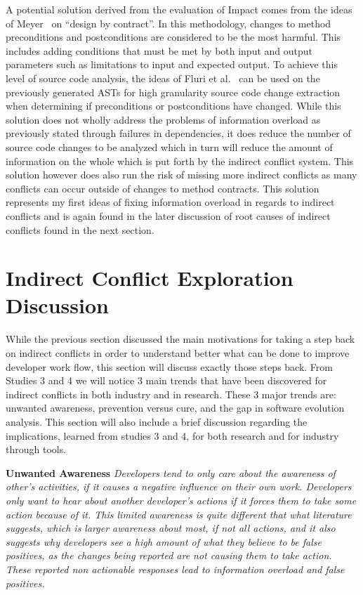 A potential solution derived from the evaluation of Impact comes from the ideas of Meyer~\cite{Meyer:1988} on 
``design by contract''. In this methodology, changes to method preconditions and postconditions are considered 
to be the most harmful. This includes adding conditions that must be met by both input and output parameters 
such as limitations to input and expected output. To achieve this level of source code analysis, the ideas of 
Fluri et al.~\cite{Fluri:2007:CDT} can be used on the previously generated ASTs for high granularity source code 
change extraction when determining if preconditions or postconditions have changed. While this solution does not 
wholly address the problems of information overload as previously stated through failures in dependencies, it does 
reduce the number of source code changes to  be analyzed which in turn will reduce the amount of information on 
the whole which is put forth by the indirect
conflict system. This solution however does also run the risk of missing more indirect conflicts as many conflicts
can occur outside of changes to method contracts. This solution represents my first ideas of fixing information overload in regards to
indirect conflicts and is again found in the later discussion of root causes of indirect conflicts found in
the next section.

\section{Indirect Conflict Exploration Discussion}

While the previous section discussed the main motivations for taking a step back on indirect conflicts in order to understand
better what can be done to improve developer work flow, this section will discuss exactly those steps back. From Studies 3 and
4 we will notice 3 main trends that have been discovered for indirect conflicts in both industry and in research. These 3 major
trends are: unwanted awareness, prevention versus cure, and the gap in software evolution analysis. This
section will also include a brief discussion regarding the implications, learned from studies 3 and 4, for both research and
for industry through tools.

\textbf{Unwanted Awareness} \textit{Developers tend to only care about the awareness of other's activities, if it causes
a negative influence on their own work. Developers only want to hear about another developer's actions if it forces them
to take some action because of it. This limited awareness is quite different that what literature suggests, which is larger
awareness about most, if not all actions, and it also suggests why developers see a high amount of what they believe to be
false positives, as the changes being reported are not causing them to take action. These reported non actionable responses
lead to information overload and false positives.}

